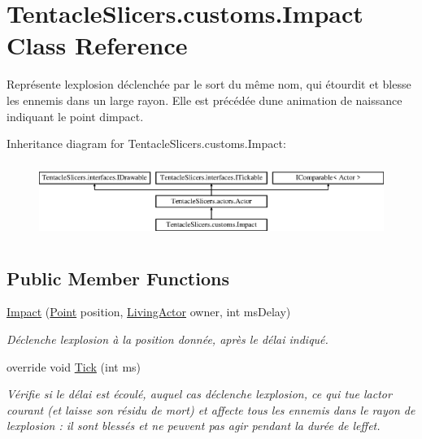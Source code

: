 \hypertarget{class_tentacle_slicers_1_1customs_1_1_impact}{}\section{Tentacle\+Slicers.\+customs.\+Impact Class Reference}
\label{class_tentacle_slicers_1_1customs_1_1_impact}


Représente l\textquotesingle{}explosion déclenchée par le sort du même nom, qui étourdit et blesse les ennemis dans un large rayon. Elle est précédée d\textquotesingle{}une animation de naissance indiquant le point d\textquotesingle{}impact.  


Inheritance diagram for Tentacle\+Slicers.\+customs.\+Impact\+:\begin{figure}[H]
\begin{center}
\leavevmode
\includegraphics[height=2.456140cm]{class_tentacle_slicers_1_1customs_1_1_impact}
\end{center}
\end{figure}
\subsection*{Public Member Functions}
\begin{DoxyCompactItemize}
\item 
\hyperlink{class_tentacle_slicers_1_1customs_1_1_impact_afc1c4ff70faf8ea632d0e46af570bc03}{Impact} (\hyperlink{class_tentacle_slicers_1_1general_1_1_point}{Point} position, \hyperlink{class_tentacle_slicers_1_1actors_1_1_living_actor}{Living\+Actor} owner, int ms\+Delay)
\begin{DoxyCompactList}\small\item\em Déclenche l\textquotesingle{}explosion à la position donnée, après le délai indiqué. \end{DoxyCompactList}\item 
override void \hyperlink{class_tentacle_slicers_1_1customs_1_1_impact_ad9ed6b3562b6063e567638058787fd6f}{Tick} (int ms)
\begin{DoxyCompactList}\small\item\em Vérifie si le délai est écoulé, auquel cas déclenche l\textquotesingle{}explosion, ce qui tue l\textquotesingle{}actor courant (et laisse son résidu de mort) et affecte tous les ennemis dans le rayon de l\textquotesingle{}explosion \+: il sont blessés et ne peuvent pas agir pendant la durée de l\textquotesingle{}effet. \end{DoxyCompactList}\end{DoxyCompactItemize}
